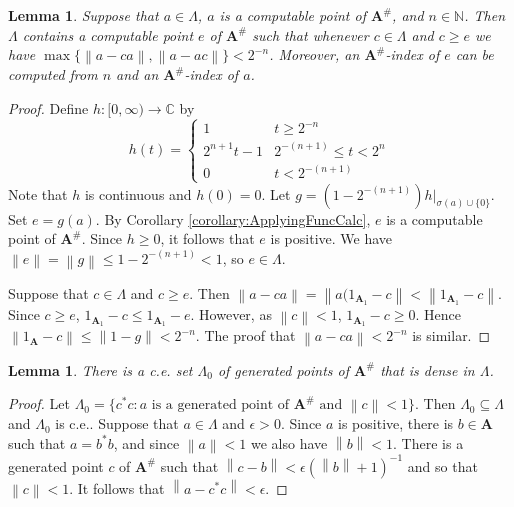 \documentclass{amsart}
\newcommand{\norm}[1]{\left\| #1 \right\|}
\newcommand{\boldA}{\mathbf{A}}
\theoremstyle{plain}
\newtheorem{lemma}[theorem]{Lemma}
\theoremstyle{definition}
\numberwithin{equation}{section}
\begin{document}
\begin{lemma}\label{lemma:ComputableApproxUnitOneStep}
Suppose that $a \in \Lambda$, $a$ is a computable point of $\boldA^\#$, and $n \in \mathbb{N}$.  Then $\Lambda$ contains a computable point $e$ of $\boldA^\#$ such that whenever $c \in \Lambda$ and $c \geq e$ we have $\max\{\norm{a-ca}, \norm{a-ac}\} < 2^{-n}$.  Moreover, an $\boldA^\#$-index of $e$ can be computed from $n$ and an $\boldA^\#$-index of $a$.
\end{lemma}
\begin{proof}
Define $h : [0, \infty) \to \mathbb{C}$ by
\[h(t) = \begin{cases}1 & t \geq 2^{-n} \\ 2^{n+1}t-1 & 2^{-(n+1)} \leq t < 2^n \\ 0 & t < 2^{-(n+1)}\end{cases}\]
Note that $h$ is continuous and $h(0) = 0$.  Let $g = (1-2^{-(n+1)})h\vert_{\sigma(a) \cup \{0\}}$.  Set $e = g(a)$.  By Corollary \ref{corollary:ApplyingFuncCalc}, $e$ is a computable point of $\boldA^\#$.  Since $h \geq 0$, it follows that $e$ is positive.  We have $\norm{e} = \norm{g} \leq 1-2^{-(n+1)} < 1$, so $e \in \Lambda$.

Suppose that $c \in \Lambda$ and $c \geq e$.  Then $\norm{a-ca} = \norm{a(1_{\boldA_1}-c} < \norm{1_{\boldA_1} - c}$.  Since $c \geq e$, $1_{\boldA_1} -c \leq 1_{\boldA_1}-e$.  However, as $\norm{c} < 1$, $1_{\boldA_1} - c \geq 0$.  Hence $\norm{1_{\boldA} - c} \leq \norm{1-g} < 2^{-n}$.  The proof that $\norm{a-ca}<2^{-n}$ is similar.
\end{proof}

\begin{lemma}
There is a c.e. set $\Lambda_0$ of generated points of $\boldA^\#$ that is dense in $\Lambda$.
\end{lemma}
\begin{proof}
Let $\Lambda_0 = \{c^*c : a \text{ is a generated point of $\boldA^\#$ and $\norm{c} < 1$}\}$.  Then $\Lambda_0 \subseteq \Lambda$ and $\Lambda_0$ is c.e..  Suppose that $a \in \Lambda$ and $\epsilon > 0$.  Since $a$ is positive, there is $b \in \boldA$ such that $a = b^*b$, and since $\norm{a} < 1$ we also have $\norm{b} < 1$.  There is a generated point $c$ of $\boldA^\#$ such that $\norm{c-b} < \epsilon(\norm{b}+1)^{-1}$ and so that $\norm{c} < 1$.  It follows that $\norm{a-c^*c} < \epsilon$.
\end{proof}
\end{document}
